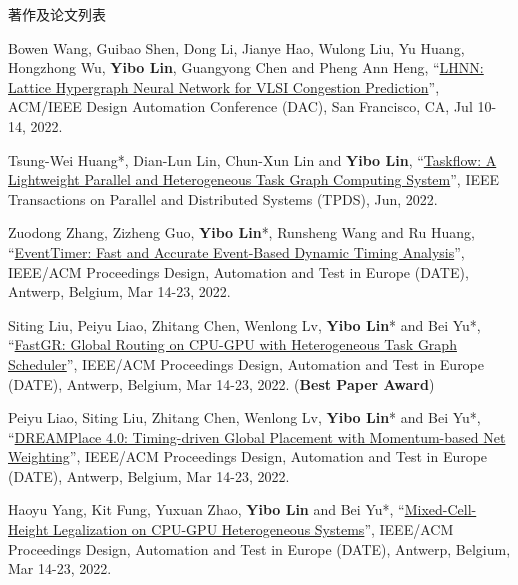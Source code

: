 \begin{rSection}{著作及论文列表}
\begin{description}[font=\normalfont, rightmargin=2em]
{}
            

\item[{[C92]}]{
        Bowen Wang, Guibao Shen, Dong Li, Jianye Hao, Wulong Liu, Yu Huang, Hongzhong Wu, \textbf{Yibo Lin}, Guangyong Chen and Pheng Ann Heng, 
    ``\href{https://doi.org/10.1145/3489517.3530675}{LHNN: Lattice Hypergraph Neural Network for VLSI Congestion Prediction}'', 
    ACM/IEEE Design Automation Conference (DAC), San Francisco, CA, Jul 10-14, 2022.
    
}
            

\item[{[J91]}]{
        Tsung-Wei Huang*, Dian-Lun Lin, Chun-Xun Lin and \textbf{Yibo Lin}, 
    ``\href{https://doi.org/10.1109/TPDS.2021.3104255}{Taskflow: A Lightweight Parallel and Heterogeneous Task Graph Computing System}'', 
    IEEE Transactions on Parallel and Distributed Systems (TPDS), Jun, 2022.
    
}
            

\item[{[C90]}]{
        Zuodong Zhang, Zizheng Guo, \textbf{Yibo Lin}*, Runsheng Wang and Ru Huang, 
    ``\href{https://doi.org/10.23919/DATE54114.2022.9774642}{EventTimer: Fast and Accurate Event-Based Dynamic Timing Analysis}'', 
    IEEE/ACM Proceedings Design, Automation and Test in Europe (DATE), Antwerp, Belgium, Mar 14-23, 2022.
    
}
            

\item[{[C89]}]{
        Siting Liu, Peiyu Liao, Zhitang Chen, Wenlong Lv, \textbf{Yibo Lin}* and Bei Yu*, 
    ``\href{https://doi.org/10.23919/DATE54114.2022.9774606}{FastGR: Global Routing on CPU-GPU with Heterogeneous Task Graph Scheduler}'', 
    IEEE/ACM Proceedings Design, Automation and Test in Europe (DATE), Antwerp, Belgium, Mar 14-23, 2022.
    (\textbf{Best Paper Award})
}
            

\item[{[C88]}]{
        Peiyu Liao, Siting Liu, Zhitang Chen, Wenlong Lv, \textbf{Yibo Lin}* and Bei Yu*, 
    ``\href{https://doi.org/10.23919/DATE54114.2022.9774725}{DREAMPlace 4.0: Timing-driven Global Placement with Momentum-based Net Weighting}'', 
    IEEE/ACM Proceedings Design, Automation and Test in Europe (DATE), Antwerp, Belgium, Mar 14-23, 2022.
    
}
            

\item[{[C87]}]{
        Haoyu Yang, Kit Fung, Yuxuan Zhao, \textbf{Yibo Lin} and Bei Yu*, 
    ``\href{https://doi.org/10.23919/DATE54114.2022.9774671}{Mixed-Cell-Height Legalization on CPU-GPU Heterogeneous Systems}'', 
    IEEE/ACM Proceedings Design, Automation and Test in Europe (DATE), Antwerp, Belgium, Mar 14-23, 2022.
    
}
\end{description}
\end{rSection}
